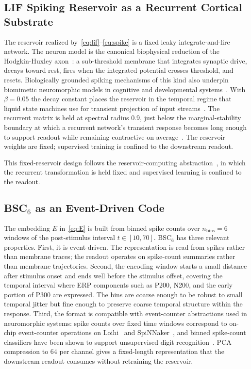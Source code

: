 \documentclass[journal]{IEEEtran}
\begin{document}
\subsection{LIF Spiking Reservoir as a Recurrent Cortical Substrate}
The reservoir realized by~\eqref{eq:lif}--\eqref{eq:spike} is a fixed leaky integrate-and-fire network. The neuron model is the canonical biophysical reduction of the Hodgkin-Huxley axon~\cite{hodgkin1952quantitative}: a sub-threshold membrane that integrates synaptic drive, decays toward rest, fires when the integrated potential crosses threshold, and resets. Biologically grounded spiking mechanisms of this kind also underpin biomimetic neuromorphic models in cognitive and developmental systems~\cite{kim2024biomimetic}. With $\beta=0.05$ the decay constant places the reservoir in the temporal regime that liquid state machines use for transient projection of input streams~\cite{maass2002liquid}. The recurrent matrix is held at spectral radius $0.9$, just below the marginal-stability boundary at which a recurrent network's transient response becomes long enough to support readout while remaining contractive on average~\cite{jaeger2001echo,sussillo2009generating}. The reservoir weights are fixed; supervised training is confined to the downstream readout.

This fixed-reservoir design follows the reservoir-computing abstraction~\cite{lukosevicius2009reservoir}, in which the recurrent transformation is held fixed and supervised learning is confined to the readout.

\subsection{BSC$_6$ as an Event-Driven Code}
The embedding $E$ in~\eqref{eq:E} is built from binned spike counts over $n_{\text{bins}}=6$ windows of the post-stimulus interval $t\in[10,70]$. BSC$_6$ has three relevant properties. First, it is event-driven. The representation is read from spikes rather than membrane traces; the readout operates on spike-count summaries rather than membrane trajectories. Second, the encoding window starts a small distance after stimulus onset and ends well before the stimulus offset, covering the temporal interval where ERP components such as P200, N200, and the early portion of P300 are expressed. The bins are coarse enough to be robust to small temporal jitter but fine enough to preserve coarse temporal structure within the response. Third, the format is compatible with event-counter abstractions used in neuromorphic systems: spike counts over fixed time windows correspond to on-chip event-counter operations on Loihi~\cite{davies2018loihi} and SpiNNaker~\cite{furber2014spinnaker}, and binned spike-count classifiers have been shown to support unsupervised digit recognition~\cite{diehl2015unsupervised}. PCA compression to 64 per channel gives a fixed-length representation that the downstream readout consumes without retraining the reservoir.
\end{document}
